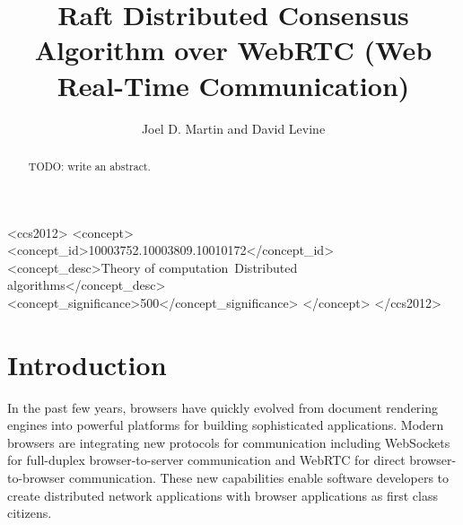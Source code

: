\documentclass{acmtog} %
\begin{document}

\title{Raft Distributed Consensus Algorithm over WebRTC (Web Real-Time Communication)} %

\author{Joel D. Martin {\upshape and} David Levine
}




%
%
\begin{CCSXML}
    <ccs2012>
    <concept>
    <concept_id>10003752.10003809.10010172</concept_id>
    <concept_desc>Theory of computation~Distributed
    algorithms</concept_desc>
    <concept_significance>500</concept_significance>
    </concept>
    </ccs2012>
\end{CCSXML}


%
%



\maketitle



\begin{abstract}
TODO: write an abstract.
\end{abstract}

\section{Introduction}
In the past few years, browsers have quickly evolved from document
rendering engines into powerful platforms for building sophisticated
applications. Modern browsers are integrating new protocols for
communication including WebSockets for full-duplex browser-to-server
communication and WebRTC for direct browser-to-browser communication.
These new capabilities enable software developers to create
distributed network applications with browser applications as first
class citizens.
\end{document}
